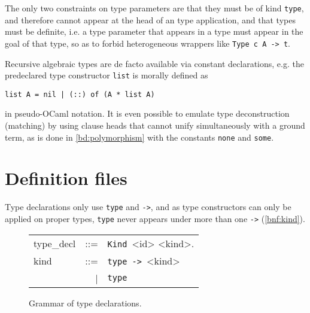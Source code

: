 \begin{figure}
  \centering
  
\end{figure}

The only two constraints on type parameters are that they must be of
kind \lstinline{type}, and therefore cannot appear at the head of an
type application, and that types must be definite, i.e. a type parameter
that appears in a type must appear in the goal of that type, so as to
forbid heterogeneous wrappers like \lstinline{Type c A -> t}.

Recursive algebraic types are de facto available via constant
declarations, e.g. the predeclared type constructor \lstinline{list} is
morally defined as
\begin{center}
  \lstinline{list A = nil | (::) of (A * list A)}
\end{center}
in pseudo-OCaml notation.  It is even possible to emulate type
deconstruction (matching) by using clause heads that cannot unify
simultaneously with a ground term, as is done in
\autoref{bd:polymorphism} with the constants \lstinline{none} and
\lstinline{some}.


\section{Definition files}

Type declarations only use \lstinline{type} and \lstinline{->}, and as
type constructors can only be applied on proper types, \lstinline{type}
never appears under more than one \lstinline{->} (\autoref{bnf:kind}).
\begin{figure}[ht]
  \centering
  \begin{tabular}{lrl}
    type\_decl &::=& \lstinline!Kind !<id> <kind>. \\
    kind       &::=& \lstinline!type -> !<kind> \\
               & | & \lstinline!type! \\
  \end{tabular}
  \caption{Grammar of type declarations.\label{bnf:kind}}
\end{figure}

